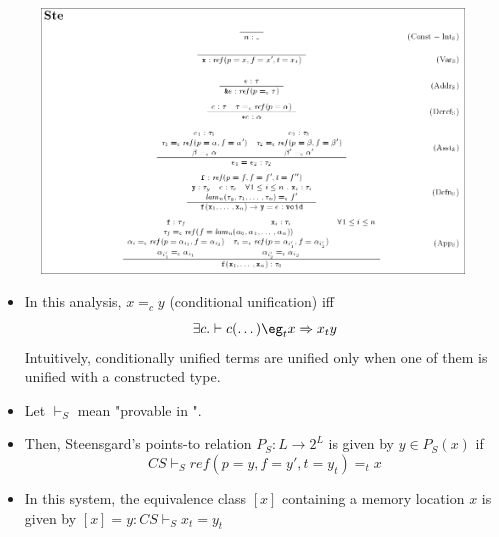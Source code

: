 \documentclass{beamer}
\begin{document}
\begin{frame}[allowframebreaks]
  \begin{figure}
    \centering
    \includegraphics[scale=0.3]{steensgard_inference_rules.png}
  \end{figure}

  \framebreak

  \begin{itemize}
  \item In this analysis, $x =_c y$ (conditional unification) iff
    $$ \exists c. \vdash c(\dotso) \eg_t x \Rightarrow x_t y $$
    Intuitively, conditionally unified terms are unified only when one
    of them is unified with a constructed type.
  \item Let $\vdash_S$ mean "provable in ".
  \item Then, Steensgard's points-to relation $P_S: L \rightarrow 2^L$
    is given by $ y \in P_S(x) $ if 
    $$ CS \vdash_S ref(p=y, f=y', t = y_t) =_t x $$
  \item In this system, the equivalence class $[x]$ containing a memory
    location $x$ is given by $[x] = {y: CS \vdash_S x_t = y_t }$
  \end{itemize}

\end{frame}
\end{document}
